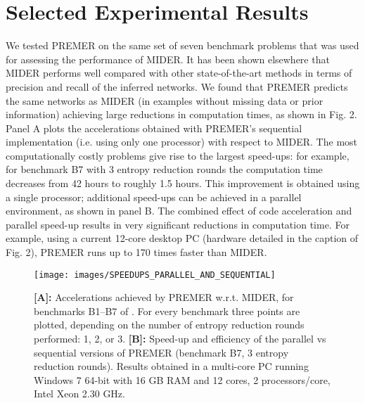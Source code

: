 \documentclass{llncs}
\begin{document}
\section{Selected Experimental Results}
\label{sec:bench}

% 
We tested PREMER on the same set of seven benchmark problems that was used for assessing the performance of MIDER. It has been shown elsewhere \cite{villaverde2014mider} that MIDER performs well compared with other state-of-the-art methods in terms of precision and recall of the inferred networks. We found that PREMER predicts the same networks as MIDER (in examples without missing data or prior information) achieving large reductions in computation times, as shown in Fig. 2.
Panel A plots the accelerations obtained with PREMER's sequential implementation (i.e. using only one processor) with respect to MIDER. The most computationally costly problems give rise to the largest speed-ups: for example, for benchmark B7 with 3 entropy reduction rounds the computation time decreases from 42 hours to roughly 1.5 hours. This improvement is obtained using a single processor; additional speed-ups can be achieved in a parallel environment, as shown in panel B. The combined effect of code acceleration and parallel speed-up results in very significant reductions in computation time. For example, using a current 12-core desktop PC (hardware detailed in the caption of Fig. 2), PREMER runs up to 170 times faster than MIDER. 

\begin{figure}[t]
  {
  {\texttt{[image: images/SPEEDUPS\_PARALLEL\_AND\_SEQUENTIAL]}}
	\caption{\textbf{[A]:} Accelerations achieved by PREMER w.r.t. MIDER, for benchmarks B1--B7 of \cite{villaverde2014mider}. For every benchmark 
three points are plotted, depending on the number of entropy reduction rounds performed: 1, 2, or 3.
	          \textbf{[B]:} Speed-up and efficiency of the parallel vs sequential versions of PREMER (benchmark B7, 3 entropy reduction rounds).
						Results obtained in a multi-core PC running Windows 7 64-bit with 16 GB RAM and 12 cores, 2 processors/core, Intel Xeon 2.30 GHz.}}
				\label{speedups}
\end{figure}
\end{document}
